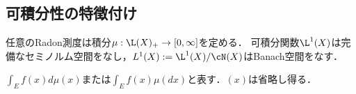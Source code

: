 \documentclass[uplatex, dvipdfmx]{jsreport}
\begin{document}
\subsection{可積分性の特徴付け}

\begin{tcolorbox}[colframe=ForestGreen, colback=ForestGreen!10!white,breakable,colbacktitle=ForestGreen!40!white,coltitle=black,fonttitle=\bfseries\sffamily,
title=]
    任意のRadon測度は積分$\mu:\L(X)_+\to[0,\infty]$を定める．
    可積分関数$\L^1(X)$は完備なセミノルム空間をなし，$L^1(X):=\L^1(X)/\cN(X)$はBanach空間をなす．
\end{tcolorbox}

\begin{notation}
    $\int_Ef(x)d\mu(x)$または$\int_Ef(x)\mu(dx)$と表す．$(x)$は省略し得る．
\end{notation}
\end{document}
